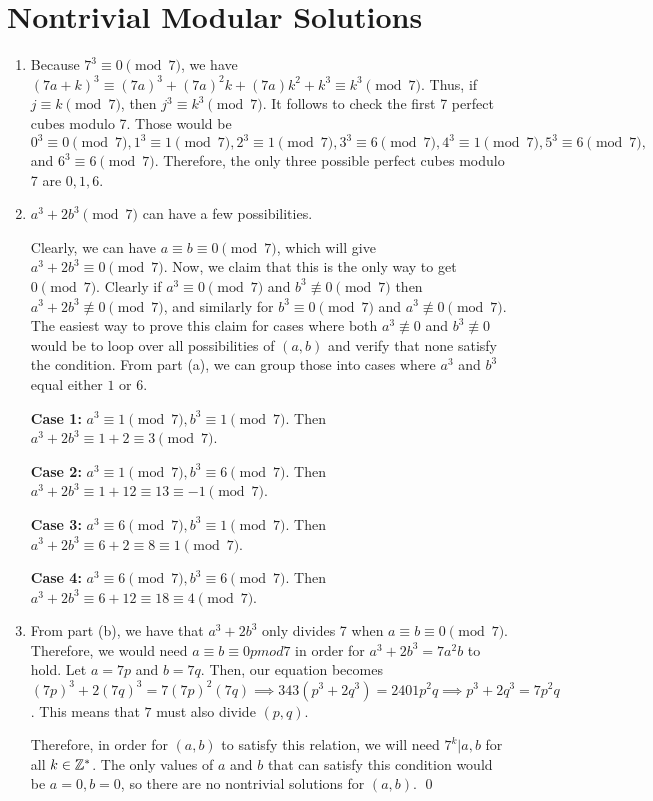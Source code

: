 \documentclass{article}
\begin{document}
	\section{Nontrivial Modular Solutions}
	\begin{enumerate}[label=\alph*)]
		\item Because $7^3 \equiv 0 \pmod 7$, we have $(7a+k)^3 \equiv (7a)^3 + (7a)^2k + (7a)k^2 + k^3 \equiv k^3 \pmod 7$. 
			Thus, if $j \equiv k \pmod 7$, then $j^3 \equiv k^3 \pmod 7$. It follows to check the first 7 perfect cubes modulo 7.
			Those would be $0^3 \equiv 0 \pmod 7, 1^3 \equiv 1 \pmod 7, 2^3 \equiv 1 \pmod 7, 3^3 \equiv 6 \pmod 7,
			4^3 \equiv 1 \pmod 7, 5^3 \equiv 6 \pmod 7,$ and $6^3 \equiv 6 \pmod 7$. Therefore, the only three possible 
			perfect cubes modulo 7 are $\boxed{0, 1, 6}$.
		\item $a^3 + 2b^3 \pmod 7$ can have a few possibilities. 

			Clearly, we can have $a \equiv b \equiv 0 \pmod 7$, which will give $a^3 + 2b^3 \equiv 0 \pmod 7$. Now,
			we claim that this is the only way to get $0 \pmod 7$. Clearly if $a^3 \equiv 0 \pmod 7$ and $b^3 \not\equiv 0 \pmod 7$
			then $a^3 + 2b^3 \not\equiv 0 \pmod 7$, and similarly for $b^3 \equiv 0 \pmod 7$ and $a^3 \not\equiv 0 \pmod 7$.
			The easiest way to prove this claim for cases where both $a^3 \not\equiv 0$ and $b^3 \not\equiv 0$ would be to loop over 
			all possibilities of $(a, b)$ and verify that none satisfy the condition. From part (a), we can group those 
			into cases where $a^3$ and $b^3$ equal either $1$ or $6$.

			\textbf{Case 1:} $a^3 \equiv 1 \pmod 7, b^3 \equiv 1 \pmod 7$. Then $a^3 + 2b^3 \equiv 1 + 2 \equiv 3 \pmod 7$.
			
			\textbf{Case 2:} $a^3 \equiv 1 \pmod 7, b^3 \equiv 6 \pmod 7$. Then $a^3 + 2b^3 \equiv 1 + 12 \equiv 13 \equiv -1 \pmod 7$.

			\textbf{Case 3:} $a^3 \equiv 6 \pmod 7, b^3 \equiv 1 \pmod 7$. Then $a^3 + 2b^3 \equiv 6 + 2 \equiv 8 \equiv 1 \pmod 7$.

			\textbf{Case 4:} $a^3 \equiv 6 \pmod 7, b^3 \equiv 6 \pmod 7$. Then $a^3 + 2b^3 \equiv 6 + 12 \equiv 18 \equiv 4 \pmod 7$.

		\item From part (b), we have that $a^3 + 2b^3$ only divides 7 when $a \equiv b \equiv 0 \pmod 7$. Therefore, we would need 
		$a \equiv b \equiv 0 pmod 7$ in order for $a^3 + 2b^3 = 7a^2b$ to hold. Let $a = 7p$ and $b = 7q$. Then, our equation 
		becomes $(7p)^3 + 2(7q)^3 = 7(7p)^2(7q) \implies 343(p^3+2q^3) = 2401p^2q \implies p^3 + 2q^3 = 7p^2q$. This means that $7$ 
		must also divide $(p, q)$. 
		
		Therefore, in order for $(a, b)$ to satisfy this relation, we will need $7^k | a, b$ for all $k \in \mathbb Z^*$. The only values 
		of $a$ and $b$ that can satisfy this condition would be $a = 0, b = 0$, so there are no nontrivial solutions for $(a, b)$.
		\qed
	\end{enumerate}
\end{document}
